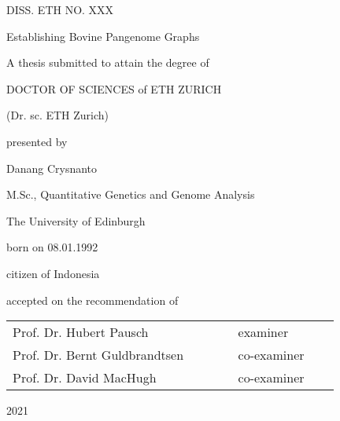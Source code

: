 \documentclass[../main.tex]{subfiles}
\begin{document}
\setlength{\parskip}{0pt}
\begin{center}
    \thispagestyle{empty}

    DISS. ETH NO. XXX 

    \vspace{2cm}

    \doublespacing
    
    {\LARGE Establishing Bovine Pangenome Graphs}
    

    \vspace{2cm}
    
    
    A thesis submitted to attain the degree of

    DOCTOR OF SCIENCES of ETH ZURICH

    (Dr. sc. ETH Zurich)
    \vspace{1cm}

    presented by

    \vspace{1cm}
    Danang Crysnanto  

    \vspace{1cm}

    M.Sc., Quantitative Genetics and Genome Analysis 
    
    The University of Edinburgh

    \vspace{1cm}

    born on 08.01.1992

    citizen of Indonesia

    \vspace{1.5cm}

    accepted on the recommendation of \\

        \begin{tabular}{ll}
        Prof. Dr. Hubert Pausch~ ~ ~ ~ ~ ~ ~ & examiner         \\
        Prof. Dr. Bernt Guldbrandtsen~ ~ ~ ~ & co-examiner~ ~~  \\
        Prof. Dr. David MacHugh~ ~ ~ ~ ~ ~ ~ & co-examiner     
        \end{tabular}


    \vspace{2cm}
    2021
\end{center}
\end{document}
